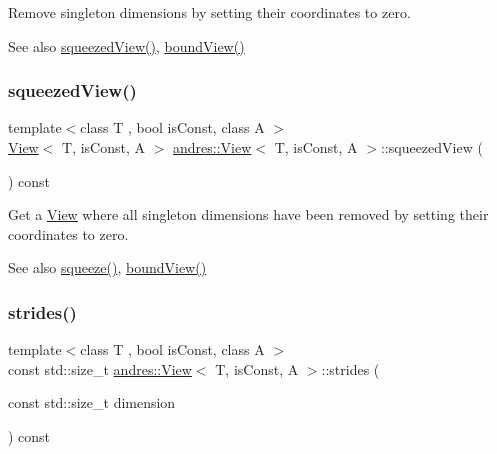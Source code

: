 Remove singleton dimensions by setting their coordinates to zero.

\begin{DoxySeeAlso}{See also}
\hyperlink{classandres_1_1View_ab7dc15479fe9bb3eb533564598d30341}{squeezed\+View()}, \hyperlink{classandres_1_1View_afedd24824bbb3ada02cb5344468d8bb8}{bound\+View()} 
\end{DoxySeeAlso}
\mbox{\label{classandres_1_1View_ab7dc15479fe9bb3eb533564598d30341}} 
\subsubsection{\texorpdfstring{squeezed\+View()}{squeezedView()}}
{\footnotesize\ttfamily template$<$class T , bool is\+Const, class A $>$ \\
\hyperlink{classandres_1_1View}{View}$<$ T, is\+Const, A $>$ \hyperlink{classandres_1_1View}{andres\+::\+View}$<$ T, is\+Const, A $>$\+::squeezed\+View (\begin{DoxyParamCaption}{ }\end{DoxyParamCaption}) const\hspace{0.3cm}{\ttfamily [inline]}}

Get a \hyperlink{classandres_1_1View}{View} where all singleton dimensions have been removed by setting their coordinates to zero.

\begin{DoxySeeAlso}{See also}
\hyperlink{classandres_1_1View_a922763728fb80d24c32a5e5964537bdb}{squeeze()}, \hyperlink{classandres_1_1View_afedd24824bbb3ada02cb5344468d8bb8}{bound\+View()} 
\end{DoxySeeAlso}
\mbox{\label{classandres_1_1View_ab523efc66788e8025f88b5fca0fa9d0e}} 
\subsubsection{\texorpdfstring{strides()}{strides()}}
{\footnotesize\ttfamily template$<$class T , bool is\+Const, class A $>$ \\
const std\+::size\+\_\+t \hyperlink{classandres_1_1View}{andres\+::\+View}$<$ T, is\+Const, A $>$\+::strides (\begin{DoxyParamCaption}\item[{const std\+::size\+\_\+t}]{dimension }\end{DoxyParamCaption}) const\hspace{0.3cm}{\ttfamily [inline]}}

